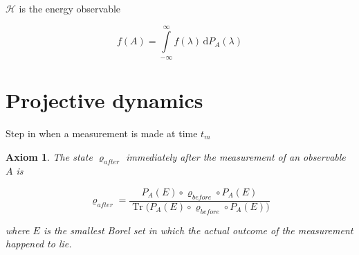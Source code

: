 \documentclass{article}
\newtheorem{axiom}{Axiom}
\DeclareMathOperator{\tr}{Tr}
\begin{document}
$\mathcal{H}$ is the energy observable

\begin{equation*}
f(A) = \int\limits_{-\infty}^{\infty} f(\lambda) \, \mathrm{d}P_A(\lambda)
\end{equation*}

\section{Projective dynamics}

Step in when a measurement is made at time $t_m$

\begin{axiom}
The state $\varrho_{after}$ immediately after the measurement of an observable $A$ is

\begin{equation*}
\varrho_{after} = \dfrac{P_A(E) \circ \varrho_{before} \circ P_A(E)}{\tr\big(P_A(E) \circ \varrho_{before} \circ P_A(E)\big)}
\end{equation*}

where $E$ is the smallest Borel set in which the actual outcome of the measurement happened to lie.
\end{axiom}
\end{document}
